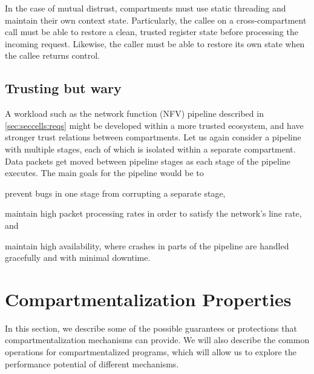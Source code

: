 In the case of mutual distrust, compartments must use static threading 
and maintain their own context state.
Particularly, the callee on a cross-compartment call must be able to 
restore a clean, trusted register state before processing the incoming request.
Likewise, the caller must be able to restore its own state when the callee
returns control.

\subsection{Trusting but wary}
\label{sec:compreview:usecases:wary}
A workload such as the network function (NFV) pipeline described in 
\autoref{sec:seccells:reqs} might be developed within a more trusted
ecosystem, and have stronger trust relations between compartments.
Let us again consider a pipeline with multiple stages, each of which
is isolated within a separate compartment.
Data packets get moved between pipeline stages as each stage of the
pipeline executes.
The main goals for the pipeline would be to 
\begin{inparaenum}
      \item prevent bugs in one stage from corrupting a separate stage, 
      \item maintain high packet processing rates in order to satisfy
            the network's line rate, and
      \item maintain high availability, where crashes in parts of the
            pipeline are handled gracefully and with minimal downtime.  
\end{inparaenum}


\section{Compartmentalization Properties}
\label{sec:compreview:properties}

In this section, we describe some of the possible guarantees or protections
that compartmentalization mechanisms can provide.
We will also describe the common operations for compartmentalized programs,
which will allow us to explore the performance potential of different
mechanisms.

